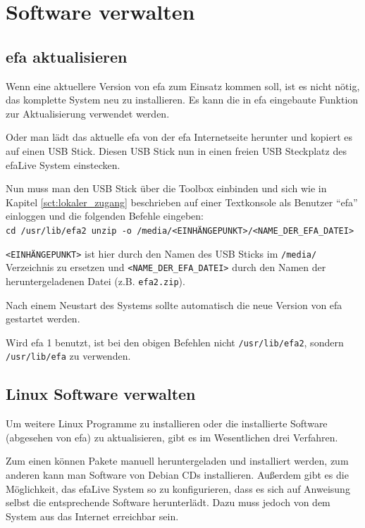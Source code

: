 \documentclass[a4paper,12pt,twoside]{article}
\begin{document}
\section{Software verwalten}
\label{sct:software_verwalten}
\subsection{efa aktualisieren}
\label{update_efa}
Wenn eine aktuellere Version von efa zum Einsatz kommen soll, ist es
nicht nötig, das komplette System neu zu installieren. Es kann die in
efa eingebaute Funktion zur Aktualisierung verwendet werden. 

Oder man lädt das aktuelle efa von der efa Internetseite \cite{EFA1}
herunter und kopiert es auf einen USB Stick. Diesen USB Stick nun in
einen freien USB Steckplatz des efaLive System einstecken. 

Nun muss man den USB Stick über die Toolbox einbinden und sich wie in
Kapitel \ref{sct:lokaler_zugang} beschrieben auf einer Textkonsole als Benutzer
"`efa"' einloggen und die folgenden Befehle eingeben:
\bigskip
\\
\texttt{cd /usr/lib/efa2
unzip -o /media/{\textless}EINHÄNGEPUNKT{\textgreater}/{\textless}NAME\_DER\_EFA\_DATEI{\textgreater}}

\bigskip
\texttt{{\textless}EINHÄNGEPUNKT{\textgreater}} ist hier durch den Namen des USB
Sticks im \texttt{/media/} Verzeichnis zu ersetzen und \texttt{{\textless}NAME\_DER\_EFA\_DATEI{\textgreater}} 
durch den Namen der heruntergeladenen Datei (z.B. \texttt{efa2.zip}).

Nach einem Neustart des Systems sollte automatisch die neue Version von
efa gestartet werden.

Wird efa 1 benutzt, ist bei den obigen Befehlen nicht \texttt{/usr/lib/efa2},
sondern \texttt{/usr/lib/efa} zu verwenden.


\subsection{Linux Software verwalten}
\label{sct:linux_software}
Um weitere Linux Programme zu installieren oder die installierte
Software (abgesehen von efa) zu aktualisieren, gibt es im Wesentlichen
drei Verfahren. 

Zum einen können Pakete manuell heruntergeladen und installiert werden,
zum anderen kann man Software von Debian CDs installieren. Außerdem
gibt es die Möglichkeit, das efaLive System so zu konfigurieren, dass
es sich auf Anweisung selbst die entsprechende Software herunterlädt.
Dazu muss jedoch von dem System aus das Internet erreichbar sein.
\end{document}
